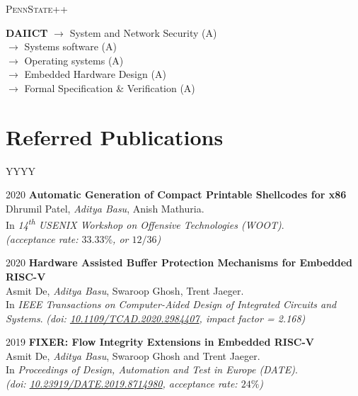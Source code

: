 \documentclass[margin]{res}
\newcommand{\daiict}{\textsc{DAIICT}}
\newcommand{\psu}{\textsc{PennState}}
\newcommand{\doi}[1]{\href{http://dx.doi.org/#1}{#1}}
\begin{document}
\begin{resume}
\begin{labeling}{\psu++}
\item[{\bfseries\daiict}]
	$\longrightarrow$ System and Network Security (A)\\
	$\longrightarrow$ Systems software (A)\\
	$\longrightarrow$ Operating systems (A)\\
	$\longrightarrow$ Embedded Hardware Design (A)\\
	$\longrightarrow$ Formal Specification \& Verification (A)

\end{labeling}

\section{Referred Publications}

\begin{labeling}{YYYY}
\item[2020]
    \textbf{Automatic Generation of Compact Printable Shellcodes for x86}\\
    Dhrumil Patel, \emph{Aditya Basu}, Anish Mathuria.\\
    In \emph{14\textsuperscript{th} USENIX Workshop on Offensive Technologies ({WOOT})}.\\
    {\itshape (acceptance rate: $33.33\%$, or $12/36$)}

\item[2020]
    \textbf{Hardware Assisted Buffer Protection Mechanisms for Embedded RISC-V}\\
    Asmit De, \emph{Aditya Basu}, Swaroop Ghosh, Trent Jaeger.\\
    In \emph{IEEE Transactions on Computer-Aided Design of Integrated Circuits and Systems}.
    {\itshape (doi: \doi{10.1109/TCAD.2020.2984407}, impact factor = 2.168)}

\item[2019]
    \textbf{FIXER: Flow Integrity Extensions in Embedded RISC-V}\\
    Asmit De, \emph{Aditya Basu}, Swaroop Ghosh and Trent Jaeger.\\
    In \emph{Proceedings of Design, Automation and Test in Europe (DATE)}.\\
    {\itshape (doi: \doi{10.23919/DATE.2019.8714980}, acceptance rate: $24\%$)}


\end{labeling}
\end{resume}
\end{document}
